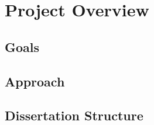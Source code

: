 \section{Project Overview}

\subsection{Goals}

\subsection{Approach}

\subsection{Dissertation Structure} 